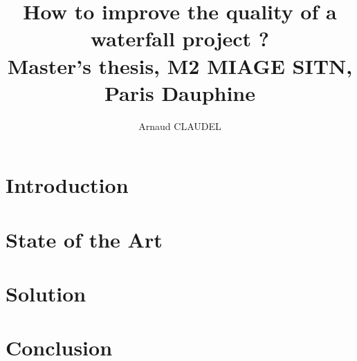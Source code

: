 \documentclass[12pt]{report}
\title{
How to improve the quality of a waterfall project ?
\\ {\large Master's thesis, M2 MIAGE SITN, Paris Dauphine}}
\author{Arnaud CLAUDEL}
\begin{document}
    \maketitle
    \tableofcontents

    \chapter{Introduction}\label{ch:introduction}
    

    \chapter{State of the Art}\label{ch:state-of-the-art}
    

    \chapter{Solution}\label{ch:solution}
    

    \chapter{Conclusion}\label{ch:conclusion}
    
\end{document}
